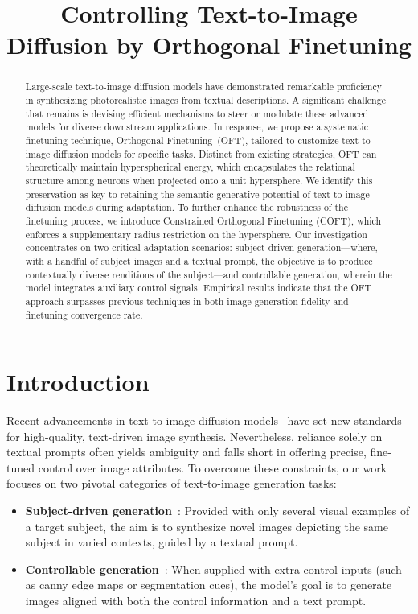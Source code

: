 \title{Controlling Text-to-Image Diffusion by Orthogonal Finetuning}

\begin{abstract}
Large-scale text-to-image diffusion models have demonstrated remarkable proficiency in synthesizing photorealistic images from textual descriptions. A significant challenge that remains is devising efficient mechanisms to steer or modulate these advanced models for diverse downstream applications. In response, we propose a systematic finetuning technique, Orthogonal Finetuning~(OFT), tailored to customize text-to-image diffusion models for specific tasks. Distinct from existing strategies, OFT can theoretically maintain hyperspherical energy, which encapsulates the relational structure among neurons when projected onto a unit hypersphere. We identify this preservation as key to retaining the semantic generative potential of text-to-image diffusion models during adaptation. To further enhance the robustness of the finetuning process, we introduce Constrained Orthogonal Finetuning (COFT), which enforces a supplementary radius restriction on the hypersphere. Our investigation concentrates on two critical adaptation scenarios: subject-driven generation—where, with a handful of subject images and a textual prompt, the objective is to produce contextually diverse renditions of the subject—and controllable generation, wherein the model integrates auxiliary control signals. Empirical results indicate that the OFT approach surpasses previous techniques in both image generation fidelity and finetuning convergence rate.
\end{abstract}

\section{Introduction}

Recent advancements in text-to-image diffusion models~\cite{saharia2022photorealistic,ramesh2022hierarchical,rombach2022high} have set new standards for high-quality, text-driven image synthesis. Nevertheless, reliance solely on textual prompts often yields ambiguity and falls short in offering precise, fine-tuned control over image attributes. To overcome these constraints, our work focuses on two pivotal categories of text-to-image generation tasks:

\begin{itemize}[leftmargin=*,nosep]

    \item \textbf{Subject-driven generation}~\cite{ruiz2023dreambooth}: Provided with only several visual examples of a target subject, the aim is to synthesize novel images depicting the same subject in varied contexts, guided by a textual prompt.
    \item \textbf{Controllable generation}~\cite{zhang2023adding,mou2023t2i}: When supplied with extra control inputs (such as canny edge maps or segmentation cues), the model’s goal is to generate images aligned with both the control information and a text prompt.
\end{itemize}

